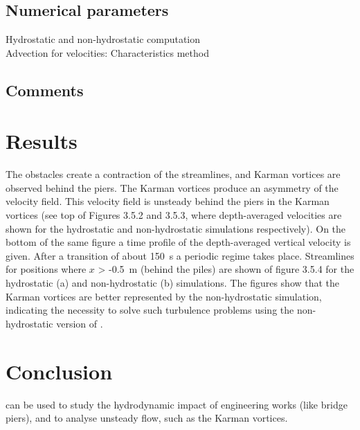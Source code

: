\subsection{Numerical parameters}
%
Hydrostatic and non-hydrostatic computation\\
Advection for velocities: Characteristics method
%
\subsection{Comments}
%
%
%
\section{Results}
%
The obstacles create a contraction of the streamlines, and Karman
vortices are observed behind the piers.
The Karman vortices produce an asymmetry of the velocity field.
This velocity field is unsteady behind the piers in the Karman vortices
(see top of Figures 3.5.2 and 3.5.3, where depth-averaged velocities are
shown for the hydrostatic and non-hydrostatic simulations respectively).
On the bottom of the same figure a time profile of the depth-averaged
vertical velocity is given.
After a transition of about 150~s a periodic regime takes place.
Streamlines for positions where $x$ > -0.5~m (behind the piles) are
shown of figure 3.5.4 for the hydrostatic (a) and non-hydrostatic (b)
simulations.
The figures show that the Karman vortices are better represented by the
non-hydrostatic simulation, indicating the necessity to solve such
turbulence problems using the non-hydrostatic version of .
%
\section{Conclusion}
%
 can be used to study the hydrodynamic impact of engineering
works (like bridge piers), and to analyse unsteady flow, such as the
Karman vortices.
%
%
